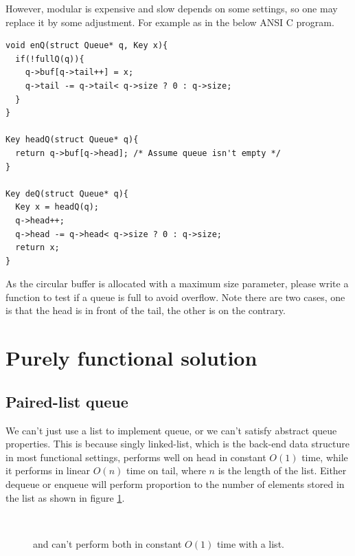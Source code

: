 \documentclass{article}
\begin{document}
However, modular is expensive and slow depends on some settings, so one
may replace it by some adjustment. For example as in the below ANSI C
program.

\begin{lstlisting}
void enQ(struct Queue* q, Key x){
  if(!fullQ(q)){
    q->buf[q->tail++] = x;
    q->tail -= q->tail< q->size ? 0 : q->size;
  }
}

Key headQ(struct Queue* q){
  return q->buf[q->head]; /* Assume queue isn't empty */
}

Key deQ(struct Queue* q){
  Key x = headQ(q);
  q->head++;
  q->head -= q->head< q->size ? 0 : q->size;
  return x;
}
\end{lstlisting}

\begin{Exercise}
As the circular buffer is allocated with a maximum size parameter, please
write a function to test if a queue is full to avoid overflow. Note
there are two cases, one is that the head is in front of the tail,
the other is on the contrary.
\end{Exercise}

\section{Purely functional solution}

\subsection{Paired-list queue}

We can't just use a list to implement queue, or we can't satisfy abstract
queue properties. This is because singly linked-list, which
is the back-end data structure in most functional settings, performs
well on head in constant $O(1)$ time, while it performs in linear $O(n)$
time on tail, where $n$ is the length of the list. Either dequeue or enqueue
will perform proportion to the number of elements stored in the list
as shown in figure \ref{fig:linked-list-queue}.

\begin{figure}[htbp]
  \centering
   \\
  \caption{ and  can't perform both in constant $O(1)$ time with a list.} \label{fig:linked-list-queue}
\end{figure}
\end{document}
